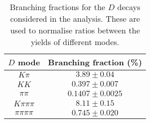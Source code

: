 \begin{table}
  \centering
  \begin{tabular}{cc}
      \toprule
      $D$ mode & Branching fraction (\%) \\
      \midrule
$K\pi$ & $3.89 \pm 0.04$ \\
$KK$ & $0.397 \pm 0.007$ \\
$\pi\pi$ & $0.1407 \pm 0.0025$ \\
$K\pi\pi\pi$ & $8.11 \pm 0.15$ \\
$\pi\pi\pi\pi$ & $0.745 \pm 0.020$ \\
      \bottomrule
  \end{tabular}
  \caption{Branching fractions for the $D$ decays considered in the analysis. These are used to normalise ratios between the yields of different modes.}
\label{tab:branching_fractions}
\end{table}
